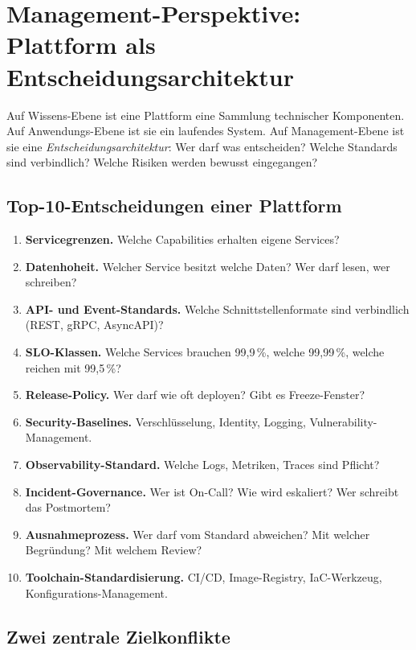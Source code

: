 \documentclass[11pt,a4paper,oneside]{article}
\begin{document}
\section{Management-Perspektive: Plattform als Entscheidungsarchitektur}

Auf Wissens-Ebene ist eine Plattform eine Sammlung technischer Komponenten. Auf Anwendungs-Ebene ist sie ein laufendes System. Auf Management-Ebene ist sie eine \emph{Entscheidungsarchitektur}: Wer darf was entscheiden? Welche Standards sind verbindlich? Welche Risiken werden bewusst eingegangen?

\subsection{Top-10-Entscheidungen einer Plattform}

\begin{enumerate}
  \item \textbf{Servicegrenzen.} Welche Capabilities erhalten eigene Services?
  \item \textbf{Datenhoheit.} Welcher Service besitzt welche Daten? Wer darf lesen, wer schreiben?
  \item \textbf{API- und Event-Standards.} Welche Schnittstellenformate sind verbindlich (REST, gRPC, AsyncAPI)?
  \item \textbf{SLO-Klassen.} Welche Services brauchen 99,9\,\%, welche 99,99\,\%, welche reichen mit 99,5\,\%?
  \item \textbf{Release-Policy.} Wer darf wie oft deployen? Gibt es Freeze-Fenster?
  \item \textbf{Security-Baselines.} Verschlüsselung, Identity, Logging, Vulnerability-Management.
  \item \textbf{Observability-Standard.} Welche Logs, Metriken, Traces sind Pflicht?
  \item \textbf{Incident-Governance.} Wer ist On-Call? Wie wird eskaliert? Wer schreibt das Postmortem?
  \item \textbf{Ausnahmeprozess.} Wer darf vom Standard abweichen? Mit welcher Begründung? Mit welchem Review?
  \item \textbf{Toolchain-Standardisierung.} CI/CD, Image-Registry, IaC-Werkzeug, Konfigurations-Management.
\end{enumerate}

\subsection{Zwei zentrale Zielkonflikte}
\end{document}
